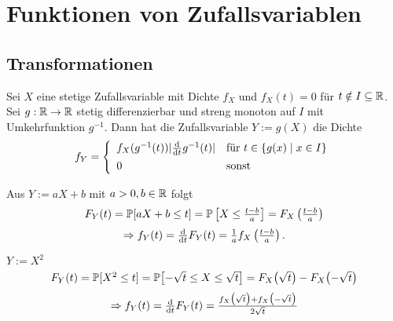 


\section{Funktionen von Zufallsvariablen}



\subsection{Transformationen}

\begin{theorem}
	Sei \(X\) eine stetige Zufallsvariable mit Dichte \(f_X\) und \(f_X(t) = 0\) für \(t \notin I \subseteq \R\). Sei \(g:\R\rightarrow\R\) stetig differenzierbar und streng monoton auf \(I\) mit Umkehrfunktion \(g^{-1}\). Dann hat die Zufallsvariable \(Y := g(X)\) die Dichte
	\[
		f_Y =
		\left\{\begin{array}{ll}
			f_X (g^{-1}(t)) \lvert\frac{\d}{\d t} g^{-1}(t)\rvert & \text{für } t \in \{g(x) \mid x \in I\} \\[1ex]
			0                                                     & \text{sonst}
		\end{array}\right.
	\]
\end{theorem}

\begin{example} Aus \(Y := aX+b\) mit \(a>0,b \in\R\) folgt
	\[ \textstyle
		F_Y(t) =
		\P[aX+b \leq t] =
		\P\left[X \leq \frac{t-b}{a}\right] =
		F_X\left(\frac{t-b}{a}\right)
	\]
	\[ \textstyle
		\Rightarrow f_Y(t) = \frac{\d}{\d t}F_Y(t) = \frac{1}{a} f_X\left(\frac{t-b}{a}\right).
	\]
\end{example}

\begin{example} \(Y := X^2\)
	\[ \textstyle
		F_Y(t) =
		\P[X^2 \leq t] =
		\P\bigl[-\sqrt{t} \leq X \leq \sqrt{t}\bigr] =
		F_X\bigl(\sqrt{t}\bigr)-F_X\bigl(-\sqrt{t}\bigr)
	\]
	\[\textstyle
		\Rightarrow f_Y(t) = \frac{\d}{\d t}F_Y(t) =
		\frac{f_X\bigl(\sqrt{t}\bigr)+f_X\bigl(-\sqrt{t}\bigr)}{2\sqrt{t}}
	\]
\end{example}

